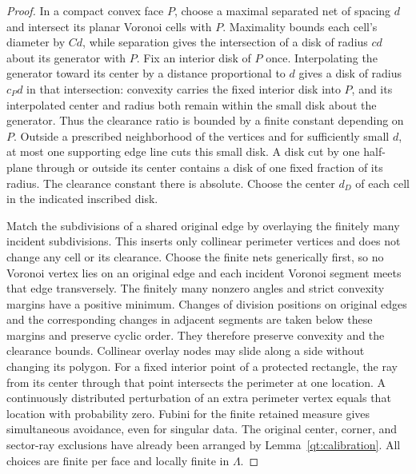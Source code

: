 \documentclass[11pt]{article}
\numberwithin{equation}{section}
\theoremstyle{definition}
\theoremstyle{remark}
\begin{document}
\begin{proof}
In a compact convex face $P$, choose a maximal separated net of spacing
$d$ and intersect its planar Voronoi cells with $P$.  Maximality bounds
each cell's diameter by $C d$, while separation gives the intersection
of a disk of radius $c d$ about its generator with $P$.  Fix an interior
disk of $P$ once.  Interpolating the generator toward its center by a
distance proportional to $d$ gives a disk of radius $c_Pd$ in that
intersection: convexity carries the fixed interior disk into $P$, and
its interpolated center and radius both remain within the small disk
about the generator.  Thus the clearance ratio is bounded by a finite
constant depending on $P$.  Outside a prescribed neighborhood of the
vertices and for sufficiently small $d$, at most one supporting edge
line cuts this small disk.  A disk cut by one half-plane through or
outside its center contains a disk of one fixed fraction of its radius.
The clearance constant there is absolute.  Choose the center $d_D$
of each cell in the indicated inscribed disk.

Match the subdivisions of a shared original edge by overlaying the
finitely many incident subdivisions.  This inserts only collinear
perimeter vertices and does not change any cell or its clearance.
Choose the finite nets generically first, so no Voronoi vertex lies
on an original edge and each incident Voronoi segment meets that edge
transversely.  The finitely many nonzero angles and strict convexity
margins have a positive minimum.  Changes of division positions on
original edges and the corresponding changes in adjacent segments
are taken below these margins and preserve cyclic order.  They
therefore preserve convexity and the clearance bounds.  Collinear
overlay nodes may slide along a side without changing its polygon.  For a fixed interior point of a
protected rectangle, the ray from its center through that point
intersects the perimeter at one location.  A continuously distributed
perturbation of an extra perimeter vertex equals that location with
probability zero.  Fubini for the finite retained measure gives
simultaneous avoidance, even for singular data.  The original center,
corner, and sector-ray exclusions have already been arranged by
Lemma~\ref{qt:calibration}.  All choices are finite per face and locally
finite in $\Lambda$.


\end{proof}
\end{document}

